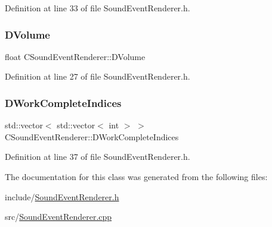 Definition at line 33 of file Sound\+Event\+Renderer.\+h.

\hypertarget{classCSoundEventRenderer_a3812aeb93aef90635a7da72fc101c686}{}\label{classCSoundEventRenderer_a3812aeb93aef90635a7da72fc101c686} 
\subsubsection{\texorpdfstring{D\+Volume}{DVolume}}
{\footnotesize\ttfamily float C\+Sound\+Event\+Renderer\+::\+D\+Volume\hspace{0.3cm}{\ttfamily [protected]}}



Definition at line 27 of file Sound\+Event\+Renderer.\+h.

\hypertarget{classCSoundEventRenderer_a59a26b4062659921cfb24d7f76253938}{}\label{classCSoundEventRenderer_a59a26b4062659921cfb24d7f76253938} 
\subsubsection{\texorpdfstring{D\+Work\+Complete\+Indices}{DWorkCompleteIndices}}
{\footnotesize\ttfamily std\+::vector$<$ std\+::vector$<$ int $>$ $>$ C\+Sound\+Event\+Renderer\+::\+D\+Work\+Complete\+Indices\hspace{0.3cm}{\ttfamily [protected]}}



Definition at line 37 of file Sound\+Event\+Renderer.\+h.



The documentation for this class was generated from the following files\+:\begin{DoxyCompactItemize}
\item 
include/\hyperlink{SoundEventRenderer_8h}{Sound\+Event\+Renderer.\+h}\item 
src/\hyperlink{SoundEventRenderer_8cpp}{Sound\+Event\+Renderer.\+cpp}\end{DoxyCompactItemize}
